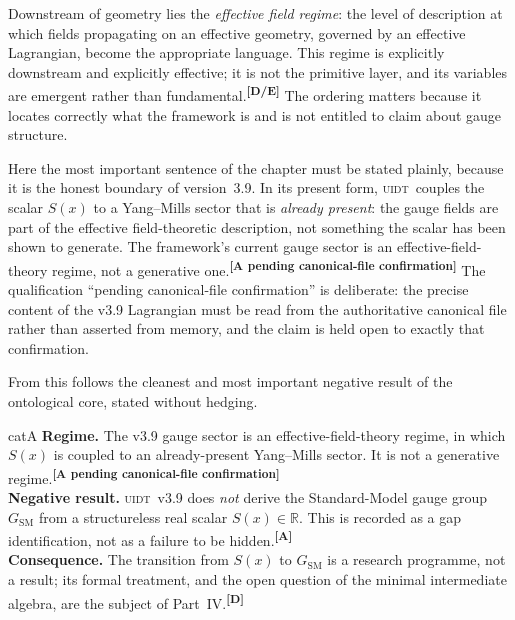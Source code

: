 \documentclass[12pt,a4paper,twoside]{article}
\theoremstyle{plain}
\theoremstyle{definition}
\theoremstyle{remark}
\newcommand{\UIDT}{\textsc{uidt}}
\newcommand{\catmark}[1]{\textsuperscript{\textsf{\textbf{[#1]}}}}
\begin{document}
Downstream of geometry lies the \emph{effective field regime}: the level of description at which fields propagating on an effective geometry, governed by an effective Lagrangian, become the appropriate language. This regime is explicitly downstream and explicitly effective; it is not the primitive layer, and its variables are emergent rather than fundamental.\catmark{D/E} The ordering matters because it locates correctly what the framework is and is not entitled to claim about gauge structure.

Here the most important sentence of the chapter must be stated plainly, because it is the honest boundary of version~3.9. In its present form, \UIDT\ couples the scalar $S(x)$ to a Yang--Mills sector that is \emph{already present}: the gauge fields are part of the effective field-theoretic description, not something the scalar has been shown to generate. The framework's current gauge sector is an effective-field-theory regime, not a generative one.\catmark{A pending canonical-file confirmation} The qualification ``pending canonical-file confirmation'' is deliberate: the precise content of the v3.9 Lagrangian must be read from the authoritative canonical file rather than asserted from memory, and the claim is held open to exactly that confirmation.

From this follows the cleanest and most important negative result of the ontological core, stated without hedging.

\begin{evidencebox}{catA}
\textbf{Regime.} The v3.9 gauge sector is an effective-field-theory regime, in which $S(x)$ is coupled to an already-present Yang--Mills sector. It is not a
generative regime.\catmark{A pending canonical-file confirmation}\\[0.3em]
\textbf{Negative result.} \UIDT\ v3.9 does \emph{not} derive the Standard-Model gauge group $G_{\mathrm{SM}}$ from a structureless real scalar $S(x)\in\mathbb{R}$. This is recorded as a gap identification, not as a
failure to be hidden.\catmark{A}\\[0.3em]
\textbf{Consequence.} The transition from $S(x)$ to $G_{\mathrm{SM}}$ is a research programme, not a result; its formal treatment, and the open question of the minimal intermediate algebra, are the subject of Part~IV.\catmark{D}
\end{evidencebox}
\end{document}
